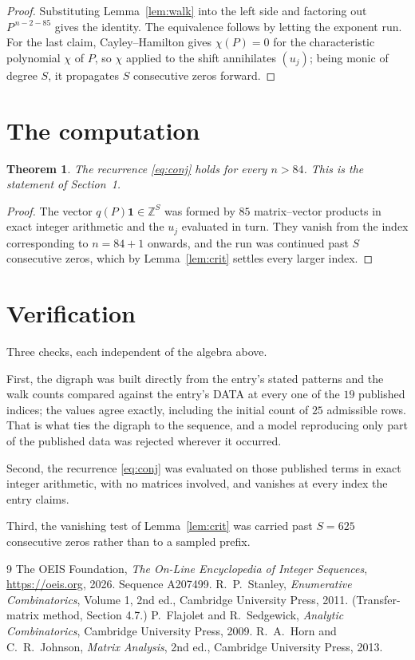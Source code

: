 \documentclass[11pt,a4paper]{article}
\theoremstyle{plain}
\newtheorem{theorem}{Theorem}
\theoremstyle{definition}
\begin{document}
\begin{proof}
Substituting Lemma~\ref{lem:walk} into the left side and factoring out
$P^{\,n-2-85}$ gives the identity. The equivalence follows by letting the exponent
run. For the last claim, Cayley--Hamilton gives $\chi(P)=0$ for the characteristic
polynomial $\chi$ of $P$, so $\chi$ applied to the shift annihilates $(u_j)$; being monic of
degree $S$, it propagates $S$ consecutive zeros forward.
\end{proof}

\section{The computation}

\begin{theorem}
The recurrence \eqref{eq:conj} holds for every $n>84$. This is the statement of
Section~1.
\end{theorem}

\begin{proof}
The vector $q(P)\mathbf{1}\in\mathbb{Z}^{S}$ was formed by $85$ matrix--vector
products in exact integer arithmetic and the $u_j$ evaluated in turn. They vanish from the
index corresponding to $n=84+1$ onwards, and the run was continued past $S$ consecutive
zeros, which by Lemma~\ref{lem:crit} settles every larger index.
\end{proof}

\section{Verification}

Three checks, each independent of the algebra above.

First, the digraph was built directly from the entry's stated patterns and the walk counts
compared against the entry's DATA at every one of the $19$ published indices; the
values agree exactly, including the initial count of $25$ admissible rows. That is
what ties the digraph to the sequence, and a model reproducing only part of the published
data was rejected wherever it occurred.

Second, the recurrence \eqref{eq:conj} was evaluated on those published terms in exact
integer arithmetic, with no matrices involved, and vanishes at every index the entry claims.

Third, the vanishing test of Lemma~\ref{lem:crit} was carried past $S=625$ consecutive
zeros rather than to a sampled prefix.

\begin{thebibliography}{9}
 The OEIS Foundation, \emph{The On-Line Encyclopedia of Integer
Sequences}, \url{https://oeis.org}, 2026. Sequence A207499.
 R.~P.~Stanley, \emph{Enumerative Combinatorics}, Volume 1, 2nd ed.,
Cambridge University Press, 2011. (Transfer-matrix method, Section 4.7.)
 P.~Flajolet and R.~Sedgewick, \emph{Analytic Combinatorics}, Cambridge
University Press, 2009.
 R.~A.~Horn and C.~R.~Johnson, \emph{Matrix Analysis}, 2nd ed., Cambridge
University Press, 2013.
\end{thebibliography}
\end{document}
